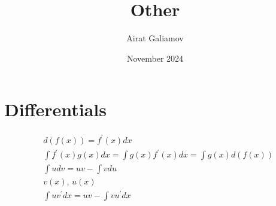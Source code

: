 \documentclass{article}
\title{Other}
\author{Airat Galiamov}
\date{November 2024}
\begin{document}
\maketitle

\section{Differentials}
\begin{align*}
    &d(f(x)) = f^\prime(x)dx \\
    &\int f^\prime(x) g(x) dx = \int g(x) f^\prime(x) dx = \int g(x) d(f(x)) \\
    &\int udv = uv - \int vdu\\
    & v(x), \, u(x)\\
    &\int uv^\prime dx = uv - \int v u^\prime dx
\end{align*}
\end{document}
